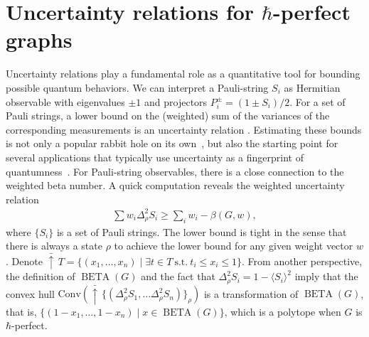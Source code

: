 \documentclass[
12pt,
prx,
aps,
reprint,
a4paper,
longbibliograph,
nofootinbib,
nobibnotes,
superscriptaddress
]{revtex4-2}
\theoremstyle{definition}
\def\conv{\mathrm{Conv}}
\def\be{\operatorname{BETA}}
\begin{document}
\section{\texorpdfstring{Uncertainty relations for $\mathbf{\hbar}$-perfect graphs}{}}
\label{sec:uncertainty_relations}
Uncertainty relations play a fundamental role as a quantitative tool for bounding possible quantum behaviors.  
We can interpret a Pauli-string $S_i$ as Hermitian observable with eigenvalues $\pm 1$ and projectors $P_i^\pm = (1\pm S_i)/2$.  
For a set of Pauli strings, a lower bound on the (weighted) sum of the variances of the corresponding measurements is an uncertainty relation \cite{huang2012variance,schwonnek2018uncertainty}. Estimating these bounds is not only a popular rabbit hole on its own~\cite{de2023uncertainty,hastings2022optimizing,xu2023bounding}, but also the starting point for several applications that typically use uncertainty as a fingerprint of quantumness~\cite{oppenheim2010uncertainty,catani2022nonclassical}. For Pauli-string observables, there is a close connection to the weighted beta number. A quick computation \cite{de2023uncertainty} reveals the weighted uncertainty relation
\begin{align}\label{eq:ucr}
    \sum w_i \Delta^2_\rho S_i\ge  \sum\nolimits_i w_i -  \beta(G,w),
\end{align}
where $\{S_i\}$ is a set of Pauli strings. The lower bound is tight in the sense that there is always a state $\rho$ to achieve the lower bound for any given weight vector $w$.
Denote $\bar{\uparrow}\,T = \{(x_1,\ldots,x_n)\mid \exists t\in T\ \mathrm{s.t.}\ t_i \le x_i \le 1\}$.
From another perspective,
the definition of $\be(G)$ and the fact that $\Delta^2_\rho S_i = 1 - \langle S_i\rangle^2$ imply that
the convex hull $\conv(\bar{\uparrow}\,\{(\Delta_\rho^2 S_1, \ldots \Delta_\rho^2 S_n)\}_\rho)$ is  a transformation of $\be(G)$, that is, $\{(1-x_1,\ldots,1-x_n) \mid x\in \be(G)\}$, which is a polytope when $G$ is $\hbar$-perfect.
\end{document}
